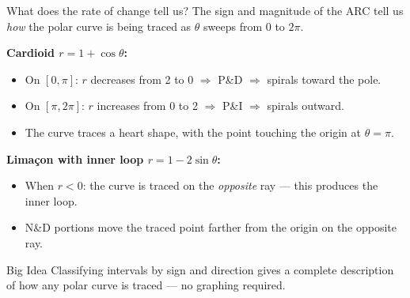 \documentclass[aspectratio=169, 11pt]{beamer}
\begin{document}
\begin{frame}[t, plain]

  \begin{block}{What does the rate of change tell us?}
    The sign and magnitude of the ARC tell us \emph{how} the polar curve is being
    traced as $\theta$ sweeps from 0 to $2\pi$.
  \end{block}

  \vspace{0.3cm}
  \textbf{Cardioid $r = 1 + \cos\theta$:}
  \begin{itemize}
    \item On $[0, \pi]$: $r$ decreases from 2 to 0 $\Rightarrow$ P\&D $\Rightarrow$ spirals toward the pole.
    \item On $[\pi, 2\pi]$: $r$ increases from 0 to 2 $\Rightarrow$ P\&I $\Rightarrow$ spirals outward.
    \item The curve traces a heart shape, with the point touching the origin at $\theta = \pi$.
  \end{itemize}

  \vspace{0.3cm}
  \textbf{Limaçon with inner loop $r = 1 - 2\sin\theta$:}
  \begin{itemize}
    \item When $r < 0$: the curve is traced on the \emph{opposite} ray --- this produces the inner loop.
    \item N\&D portions move the traced point farther from the origin on the opposite ray.
  \end{itemize}

  \vspace{0.3cm}
  \begin{block}{Big Idea}
    Classifying intervals by sign and direction gives a complete description of
    how any polar curve is traced --- no graphing required.
  \end{block}
\end{frame}
\end{document}

